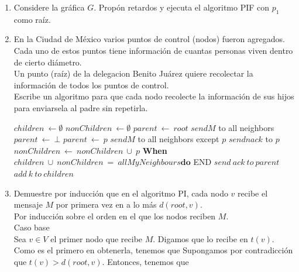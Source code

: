 \documentclass[12pt,a4paper]{report}
\begin{document}
	\begin{enumerate}
		\item {
			Considere la gráfica $G$. Propón retardos y ejecuta el algoritmo PIF con
			$p_1$ como raíz.\\
		}

		\item {
			En la Ciudad de México varios puntos de control (nodos) fueron agregados.\\
			Cada uno de estos puntos tiene información de cuantas personas viven
			dentro de cierto diámetro. \\
			Un punto (raíz) de la delegacion Benito Juárez quiere recolectar la
			información de todos los puntos de control. \\
			Escribe un algoritmo para que cada nodo recolecte la información de sus
			hijos para enviarsela al padre sin repetirla.\\

			\begin{algorithmic}[1]
				\State $children \ \leftarrow \emptyset$
				\State $nonChildren \ \leftarrow \emptyset$
					\State $parent\ \leftarrow\ root$
					\State $send M$ to all neighbors
				\Else
					\State $parent\ \leftarrow\ \bot$
				\EndIf
				\State {}
				\Start
						\State $parent\ \leftarrow\ p$
						\State $send M$ to all neighbors except $p$
					\Else
						\State $send nack$ to $p$
					\EndIf
				\End
				\State {}
				\Start
					\State $nonChildren\ \leftarrow\ nonChildren\ \cup\ {p}$
				\End
				\textbf{When} $children\ \cup\ nonChildren\ =\ allMyNeighbours
							\textbf{do}$
				\Start
						\State END
					\Else
						\State $send\ ack\ to\ parent$
					\EndIf
				\Start
					\State $add\ k\ to\ children$
				\End
				\End
			\end{algorithmic}
			}

		\item{
			Demuestre por inducción que en el algoritmo PI, cada nodo $v$ recibe el
			mensaje $M$ por primera vez en a lo más $d(root, v)$.\\

			Por inducción sobre el orden en el que los nodos reciben $M$.\\
			Caso base\\
			Sea $v \in V$ el primer nodo que recibe $M$. Digamos que lo recibe en $t(v)$.\\
			Como es el primero en obtenerla, tenemos que
			Supongamos por contradicción que $t(v) > d(root, v)$. Entonces, tenemos que


}
\end{enumerate}
\end{document}
